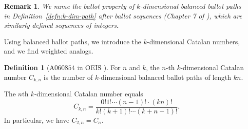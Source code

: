 \documentclass[11pt]{article}
\newtheorem{remark}[theorem]{Remark}
\theoremstyle{remark}
\theoremstyle{definition}
\newtheorem{definition}[theorem]{Definition}
\begin{document}
\begin{remark}
We name the ballot property of $k$-dimensional balanced ballot paths in Definition~\ref{defn:k-dim-path} after ballot sequences (Chapter 7 of \cite{StanleyCatalan}), which are similarly defined sequences of integers.
\end{remark}

Using balanced ballot paths, we introduce the $k$-dimensional Catalan numbers, and we find weighted analogs.
\begin{definition}[A$060854$ in OEIS \cite{oeis}]\label{def:multidim}
For $n$ and $k$, the $n$-th $k$-dimensional Catalan number $C_{k, n}$ is the number of $k$-dimensional balanced ballot paths of length $kn$.
\end{definition}

The $n$th $k$-dimensional Catalan number equals $$C_{k,n} = \frac{0!1!\cdots(n-1)! \cdot (kn)!}{k!(k+1)!\cdots(k+n-1)!}.$$ In particular, we have $C_{2, n} = C_n$.
\end{document}
